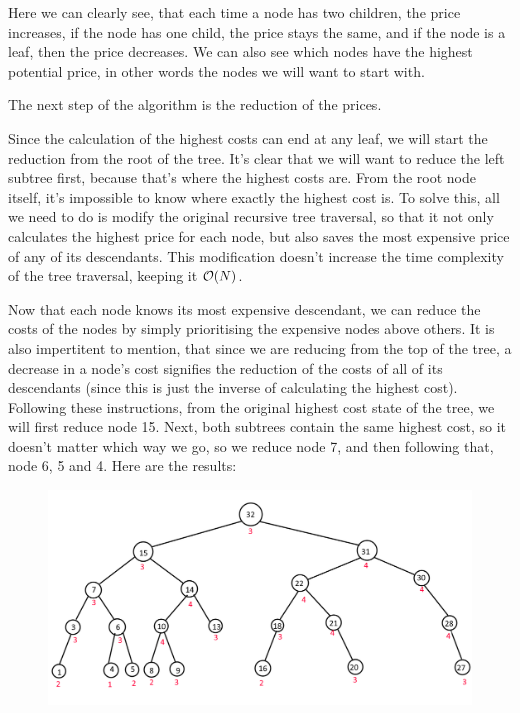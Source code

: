 \documentclass{../../../ksp}
\begin{document}
Here we can clearly see, that each time a node has two children, the price increases, if the node has one child, the price stays the same, and if the node is a leaf, then the price decreases.
We can also see which nodes have the highest potential price, in other words the nodes we will want to start with.

The next step of the algorithm is the reduction of the prices.

Since the calculation of the highest costs can end at any leaf, we will start the reduction from the root of the tree.
It's clear that we will want to reduce the left subtree first, because that's where the highest costs are.
From the root node itself, it's impossible to know where exactly the highest cost is.
To solve this, all we need to do is modify the original recursive tree traversal, so that it not only calculates the highest price for each node, but also saves the most expensive price of any of its descendants.
This modification doesn't increase the time complexity of the tree traversal, keeping it $\mathcal{O}(N)$.

Now that each node knows its most expensive descendant, we can reduce the costs of the nodes by simply prioritising the expensive nodes above others.
It is also impertitent to mention, that since we are reducing from the top of the tree, a decrease in a node's cost signifies the reduction of the costs of all of its descendants (since this is just the inverse of calculating the highest cost).
Following these instructions, from the original highest cost state of the tree, we will first reduce node 15.
Next, both subtrees contain the same highest cost, so it doesn't matter which way we go, so we reduce node 7, and then following that, node 6, 5 and 4.
Here are the results:

\begin{figure}[H]
    \centering
    \includegraphics[width=\textwidth]{./asym example reduction.png}
\end{figure}
\end{document}
